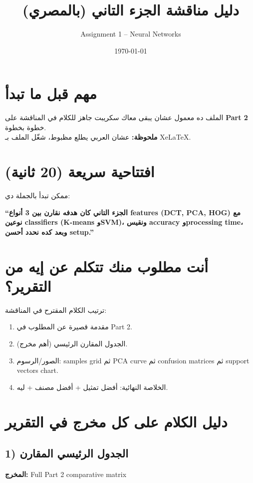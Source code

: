 \documentclass[12pt,a4paper]{article}
\title{دليل مناقشة الجزء التاني (بالمصري)}
\author{Assignment 1 -- Neural Networks}
\date{\today}
\begin{document}
\maketitle

\section*{مهم قبل ما تبدأ}
الملف ده معمول عشان يبقى معاك سكريبت جاهز للكلام في المناقشة على \textbf{Part 2} خطوة بخطوة.\\
\textbf{ملحوظة:} عشان العربي يطلع مظبوط، شغّل الملف بـ \textenglish{XeLaTeX}.

\section*{افتتاحية سريعة (20 ثانية)}
ممكن تبدأ بالجملة دي:

\textbf{``الجزء التاني كان هدفه نقارن بين 3 أنواع \textenglish{features} (\textenglish{DCT, PCA, HOG}) مع نوعين \textenglish{classifiers} (\textenglish{K-means} و\textenglish{SVM})، ونقيس \textenglish{accuracy} و\textenglish{processing time}، وبعد كده نحدد أحسن \textenglish{setup}.''}

\section*{أنت مطلوب منك تتكلم عن إيه من التقرير؟}
ترتيب الكلام المقترح في المناقشة:
\begin{enumerate}[leftmargin=1.5em]
    \item مقدمة قصيرة عن المطلوب في \textenglish{Part 2}.
    \item الجدول المقارن الرئيسي (أهم مخرج).
    \item الصور/الرسوم: \textenglish{samples grid} ثم \textenglish{PCA curve} ثم \textenglish{confusion matrices} ثم \textenglish{support vectors chart}.
    \item الخلاصة النهائية: أفضل تمثيل + أفضل مصنف + ليه.
\end{enumerate}

\section*{دليل الكلام على كل مخرج في التقرير}

\subsection*{1) الجدول الرئيسي المقارن}
\textbf{المخرج:} \textenglish{Full Part 2 comparative matrix}
\end{document}
